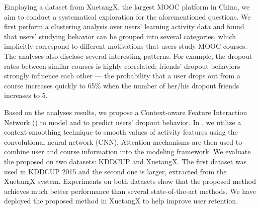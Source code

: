 Employing a  dataset from XuetangX, the largest MOOC platform in China, we aim to conduct a systematical exploration for the aforementioned questions. 
We first perform a clustering analysis over users' learning activity data and found that  users' studying behavior can be grouped into several categories, which implicitly correspond to different motivations that users study MOOC courses.
The analyses also disclose several interesting patterns. 
For example, the dropout rates between similar courses is highly correlated;
friends' dropout behaviors strongly influence each other ---
the probability that a user drops out from a course increases quickly to 65\% when the number of her/his dropout friends increases to 5.


Based on the analyses results, 
we propose a Context-aware Feature Interaction Network (\modelname{}) to
model and to predict users' dropout behavior. 
In \modelname{}, we utilize a context-smoothing technique to 
smooth values of activity features  using the convolutional neural network (CNN).
Attention mechanisms are then used to combine user and course 
information into the modeling framework.
We evaluate the proposed \modelname{} on two datasets: KDDCUP and XuetangX. The first dataset was used in KDDCUP 2015 and the second one is larger, extracted from the XuetangX system.
Experiments on both datasets 
show that the proposed method achieves much better performance than several state-of-the-art methods. 
We have deployed the proposed method in XuetangX to help improve user retention.

